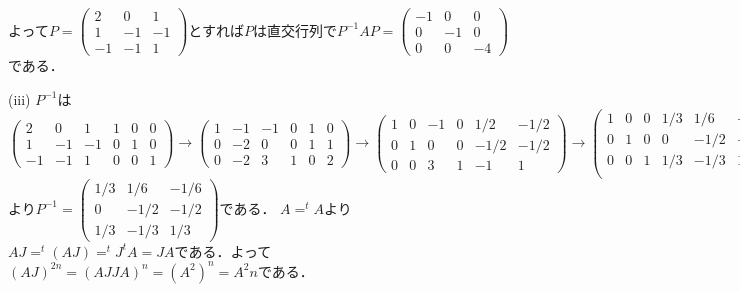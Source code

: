 \documentclass[
		book,
		head_space=20mm,
		foot_space=20mm,
		gutter=10mm,
		line_length=190mm
]{jlreq}
\begin{document}
よって$P=\begin{pmatrix}
    2 & 0 & 1 \\
    1 & -1 & -1 \\
    -1 & -1 & 1
    \end{pmatrix}$とすれば$P$は直交行列で$P^{-1}AP=\begin{pmatrix}
        -1 & 0 & 0 \\
        0 & -1 & 0 \\
        0 & 0 & -4
        \end{pmatrix}$である．

(iii)
$P^{-1}$は$\begin{pmatrix}
        2 & 0 & 1 & 1 & 0 & 0 \\
        1 & -1 & -1 & 0 & 1 & 0 \\
        -1 & -1 & 1 & 0 & 0 & 1
\end{pmatrix}\rightarrow\begin{pmatrix}
    1 & -1 & -1 & 0 & 1 & 0 \\
    0 & -2 & 0 & 0 & 1 & 1 \\
    0 & -2 & 3 & 1 & 0 & 2 
\end{pmatrix}\rightarrow \begin{pmatrix}
    1 & 0 & -1 & 0& 1/2 & -1/2 \\
    0 & 1 & 0 & 0& -1/2 & -1/2 \\
    0 & 0 & 3 & 1 & -1 & 1
    \end{pmatrix}\rightarrow \begin{pmatrix}
        1 & 0 & 0 & 1/3 & 1/6 & -1/6 \\
        0 & 1 & 0 & 0 & -1/2 & -1/2 \\
        0 & 0 & 1 & 1/3 & -1/3 & 1/3 \\
        \end{pmatrix}$より$P^{-1}=\begin{pmatrix}
            1/3 & 1/6 & -1/6 \\
            0 & -1/2 & -1/2 \\
            1/3 & -1/3 & 1/3
            \end{pmatrix}$である．
$A=^t\!A$より$AJ=^t(AJ)=^t\!J^t\!A=JA$である．よって$(AJ)^{2n}=(AJJA)^n=(A^2)^n=A^2n$である．
\end{document}
